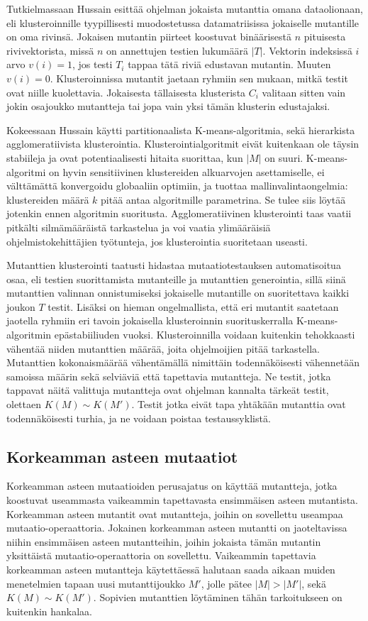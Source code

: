 \documentclass[finnish]{tktltiki2}
\begin{document}
Tutkielmassaan Hussain esittää ohjelman jokaista mutanttia omana dataolionaan, eli klusteroinnille tyypillisesti muodostetussa datamatriisissa jokaiselle mutantille on oma rivinsä. Jokaisen mutantin piirteet koostuvat binäärisestä $n$ pituisesta rivivektorista, missä $n$ on annettujen testien lukumäärä $|T|$. Vektorin indeksissä $i$ arvo $v(i) = 1$, jos testi $T_i$ tappaa tätä riviä edustavan mutantin. Muuten $v(i) = 0$. Klusteroinnissa mutantit jaetaan ryhmiin sen mukaan, mitkä testit ovat niille kuolettavia. Jokaisesta tällaisesta klusterista $C_{i}$ valitaan sitten vain jokin osajoukko mutantteja tai jopa vain yksi tämän klusterin edustajaksi. 

Kokeessaan Hussain käytti partitionaalista K-means-algoritmia, sekä hierarkista agglomeratiivista klusterointia. Klusterointialgoritmit eivät kuitenkaan ole täysin stabiileja ja ovat potentiaalisesti hitaita suorittaa, kun $|M|$ on suuri. K-means-algoritmi on hyvin sensitiivinen klustereiden alkuarvojen asettamiselle, ei välttämättä konvergoidu globaaliin optimiin, ja tuottaa mallinvalintaongelmia: klustereiden määrä $k$ pitää antaa algoritmille parametrina. Se tulee siis löytää jotenkin ennen algoritmin suoritusta. Agglomeratiivinen klusterointi taas vaatii pitkälti silmämääräistä tarkastelua ja voi vaatia ylimääräisiä ohjelmistokehittäjien työtunteja, jos klusterointia suoritetaan useasti. 

Mutanttien klusterointi taatusti hidastaa mutaatiotestauksen automatisoitua osaa, eli testien suorittamista mutanteille ja mutanttien generointia, sillä siinä mutanttien valinnan onnistumiseksi jokaiselle mutantille on suoritettava kaikki joukon $T$ testit. Lisäksi on hieman ongelmallista, että eri mutantit saatetaan jaotella ryhmiin eri tavoin jokaisella klusteroinnin suorituskerralla K-means-algoritmin epästabiiliuden vuoksi. Klusteroinnilla voidaan kuitenkin tehokkaasti vähentää niiden mutanttien määrää, joita ohjelmoijien pitää tarkastella. Mutanttien kokonaismäärää vähentämällä nimittäin todennäköisesti vähennetään samoissa määrin sekä selviäviä että tapettavia mutantteja. Ne testit, jotka tappavat näitä valittuja mutantteja ovat ohjelman kannalta tärkeät testit, olettaen $K(M) \sim K(M')$. Testit jotka eivät tapa yhtäkään mutanttia ovat todennäköisesti turhia, ja ne voidaan poistaa testaussyklistä.

\subsection{Korkeamman asteen mutaatiot}
Korkeamman asteen mutaatioiden perusajatus on käyttää mutantteja, jotka koostuvat useammasta vaikeammin tapettavasta ensimmäisen asteen mutantista. Korkeamman asteen mutantit ovat mutantteja, joihin on sovellettu useampaa mutaatio-operaattoria. Jokainen korkeamman asteen mutantti on jaoteltavissa niihin ensimmäisen asteen mutantteihin, joihin jokaista tämän mutantin yksittäistä mutaatio-operaattoria on sovellettu. Vaikeammin tapettavia korkeamman asteen mutantteja käytettäessä halutaan saada aikaan muiden menetelmien tapaan uusi mutanttijoukko $M'$, jolle pätee $|M| > |M'|$, sekä $K(M) \sim K(M')$. Sopivien mutanttien löytäminen tähän tarkoitukseen on kuitenkin hankalaa. 
\end{document}
